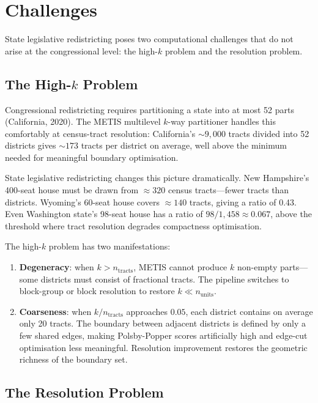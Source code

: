 \section{Challenges}
\label{sec:challenges}

State legislative redistricting poses two computational challenges that do not
arise at the congressional level: the high-$k$ problem and the resolution problem.

\subsection{The High-$k$ Problem}
\label{sec:challenges:highk}

Congressional redistricting requires partitioning a state into at most 52 parts
(California, 2020). The METIS multilevel $k$-way partitioner
\citep{karypis1998fast} handles this comfortably at census-tract resolution:
California's $\sim\!9{,}000$ tracts divided into 52 districts gives
$\sim\!173$ tracts per district on average, well above the minimum needed
for meaningful boundary optimisation.

State legislative redistricting changes this picture dramatically. New Hampshire's
400-seat house must be drawn from $\approx 320$ census tracts---fewer tracts
than districts. Wyoming's 60-seat house covers $\approx 140$ tracts, giving a
ratio of 0.43. Even Washington state's 98-seat house has a ratio of
$98/1{,}458 \approx 0.067$, above the threshold where tract resolution degrades
compactness optimisation.

The high-$k$ problem has two manifestations:
\begin{enumerate}
  \item \textbf{Degeneracy}: when $k > n_{\mathrm{tracts}}$, METIS cannot produce
    $k$ non-empty parts---some districts must consist of fractional tracts.
    The pipeline switches to block-group or block resolution to restore
    $k \ll n_{\mathrm{units}}$.
  \item \textbf{Coarseness}: when $k/n_{\mathrm{tracts}}$ approaches $0.05$,
    each district contains on average only 20 tracts. The boundary between
    adjacent districts is defined by only a few shared edges, making
    Polsby-Popper scores artificially high and edge-cut optimisation less
    meaningful. Resolution improvement restores the geometric richness of the
    boundary set.
\end{enumerate}

\subsection{The Resolution Problem}
\label{sec:challenges:resolution}

